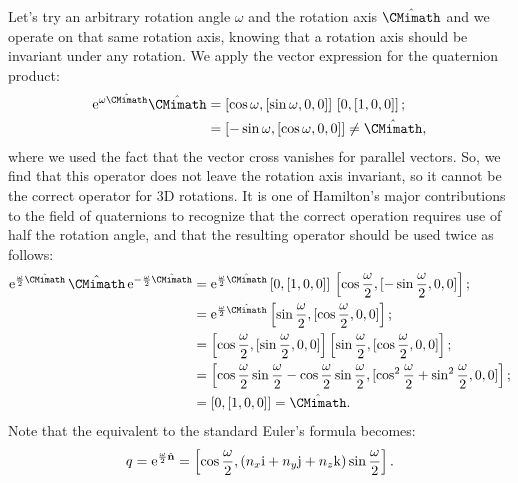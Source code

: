 Let's try an arbitrary rotation angle $\omega$ and the rotation axis $\hat{\CMimath}$ and we operate on that same rotation axis, knowing that a rotation axis should be invariant under any rotation.  We apply the vector expression for the quaternion product:
\begin{equation}
\begin{split}
	\mathrm{e}^{\omega \hat{\CMimath}} \hat{\CMimath} &= \left[\cos\omega,[\sin\omega,0,0]\right]\,\left[0,[1,0,0]\right];\\
	& = \left[-\sin\omega, [\cos\omega,0,0]\right] \ne \hat{\CMimath},
\end{split}
\end{equation}
where we used the fact that the vector cross vanishes for parallel vectors.  So, we find that this operator does not leave the rotation axis invariant, so it cannot be the correct operator for 3D rotations.  It is one of Hamilton's major contributions to the field of quaternions to recognize that the correct operation requires use of half the rotation angle, and that the resulting operator should be used twice as follows:
\begin{equation}
\begin{split}
	\mathrm{e}^{\frac{\omega}{2} \hat{\CMimath}}\, \hat{\CMimath}\,\mathrm{e}^{-\frac{\omega}{2} \hat{\CMimath}} &=
	\mathrm{e}^{\frac{\omega}{2} \hat{\CMimath}} \left[0,[1,0,0]\right]\,\left[\cos\frac{\omega}{2},[-\sin\frac{\omega}{2},0,0]\right];\\
	&=\mathrm{e}^{\frac{\omega}{2} \hat{\CMimath}} \left[\sin\frac{\omega}{2},[\cos\frac{\omega}{2},0,0]\right];\\
	&= \left[\cos\frac{\omega}{2},[\sin\frac{\omega}{2},0,0]\right] \left[\sin\frac{\omega}{2},[\cos\frac{\omega}{2},0,0]\right];\\
	&=\left[ \cos\frac{\omega}{2}\sin\frac{\omega}{2}-\cos\frac{\omega}{2}\sin\frac{\omega}{2}, [ \cos^2\frac{\omega}{2}+ \sin^2\frac{\omega}{2},0,0]\right];\\
	&= \left[0,[1,0,0]\right] = \hat{\CMimath}.
\end{split}
\end{equation}
Note that the equivalent to the standard Euler's formula becomes:
\begin{equation}
	q = \mathrm{e}^{\frac{\omega}{2} \hat{\mathbf{n}}} = \left[\cos\frac{\omega}{2},(n_x\qi+n_y \qj+n_z \qk)\sin\frac{\omega}{2}\right].\OClabel{eq:quatrot}
\end{equation}


